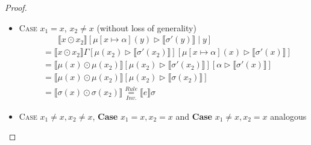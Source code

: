 \documentclass[twoside, english]{sdqthesis}
\newcommand{\bbracket}[1]{\llbracket #1 \rrbracket}
\newcommand{\tr}[0]{\triangleright}
\newtheorem{lemma}[theorem]{Lemma}
\theoremstyle{definition}
\begin{document}
\begin{proof}
\begin{itemize}
\begin{itemize}
\begin{itemize}
\begin{itemize}
                \item \textsc{Case $x_1=x$, $x_2 \neq x$} (without loss of generality)
                \begin{align*}
                  &\phantom{=}\ \ \bbracket{x \odot x_2}[\mu[x\mapsto \alpha](y) \tr \bbracket{\sigma'(y)} \mid y]
                  \\ &=\bbracket{x \odot x_2}\Gamma[\mu(x_2)\tr \bbracket{\sigma'(x_2)}][\mu[x \mapsto \alpha](x) \tr \bbracket{\sigma'(x)}]
                  \\ &=\bbracket{\mu(x) \odot \mu(x_2)}[\mu(x_2)\tr \bbracket{\sigma'(x_2)}][\alpha \tr \bbracket{\sigma'(x)}]
                  \\ &=\bbracket{\mu(x) \odot \mu(x_2)}[\mu(x_2)\tr \bbracket{\sigma(x_2)}]
                  \\ &=\bbracket{\sigma(x) \odot \sigma(x_2)} \underset{Inv.}{\overset{Rule}{=}} \bbracket{e}\sigma
                \end{align*}
                \item \textsc{Case} $x_1\neq x, x_2 \neq x$, \textbf{Case} $x_1 = x, x_2 = x$ and \textbf{Case} $x_1 \neq x, x_2 = x$ analogous
              \end{itemize}
          \end{itemize}
      \end{itemize}
  \end{itemize}
\end{proof}


\end{document}
